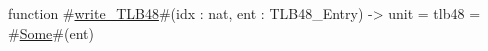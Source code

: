 function #\hyperref[sailRISCVzwritezyTLB48]{write\_TLB48}#(idx : nat, ent : TLB48_Entry) -> unit =
  tlb48 = #\hyperref[sailRISCVzSome]{Some}#(ent)
